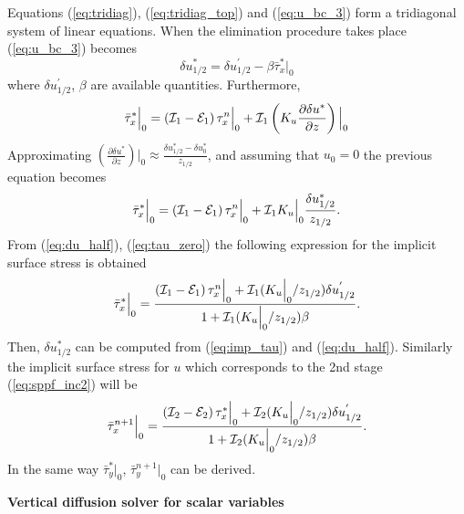 \documentclass{UMDP_article}
\begin{document}
Equations (\ref{eq:tridiag}), (\ref{eq:tridiag_top}) and
(\ref{eq:u_bc_3}) form a tridiagonal system of linear equations.  When
the elimination procedure takes place (\ref{eq:u_bc_3}) becomes
\begin{equation}
  \delta u_{1/2}^{*}=\delta u_{1/2}^{'}-\beta\bar{\tau}_{x}^{*}\Big|_{0}\label{eq:du_half}
\end{equation}
where $\delta u_{1/2}^{'}$, $\beta$ are available
quantities. Furthermore,
\begin{equation*}
  \bar{\tau}_{x}^{*}\Big|_{0}=\left({\cal I}_{1}-{\cal E}_{1}\right)\tau_{x}^{n}\Big|_{0}+{\cal I}_{1}\left(K_{u}\frac{\partial\delta u^{*}}{\partial z}\right)\Big|_{0}
\end{equation*}
Approximating $\left(\frac{\partial\delta u^{*}}{\partial
    z}\right)\Big|_{0}\approx\frac{\delta u_{1/2}^{*}-\delta
  u_{0}^{*}}{z_{1/2}}$, and assuming that $u_{0}=0$ the previous
equation becomes
\begin{equation}
  \bar{\tau}_{x}^{*}\Big|_{0}=\left({\cal I}_{1}-{\cal E}_{1}\right)\tau_{x}^{n}\Big|_{0}+{\cal I}_{1}K_{u}\Big|_{0}\frac{\delta u_{1/2}^{*}}{z_{1/2}}.\label{eq:tau_zero}
\end{equation}
From (\ref{eq:du_half}), (\ref{eq:tau_zero}) the following expression
for the implicit surface stress is obtained
\begin{equation}
  \bar{\tau}_{x}^{*}\Big|_{0}=\frac{\left({\cal I}_{1}-{\cal E}_{1}\right)\tau_{x}^{n}\Big|_{0}+{\cal I}_{1}(K_{u}\Big|_{0}/z_{1/2})\delta
    u_{1/2}^{'}}{1+{\cal I}_{1}(K_{u}\Big|_{0}/z_{1/2})\beta}.\label{eq:imp_tau}
\end{equation}
Then, $\delta u_{1/2}^{*}$ can be computed from (\ref{eq:imp_tau}) and
(\ref{eq:du_half}). Similarly the implicit surface stress for $u$
which corresponds to the 2nd stage (\ref{eq:sppf_inc2}) will be
\begin{equation}
  \bar{\tau}_{x}^{n+1}\Big|_{0}=\frac{\left({\cal I}_{2}-{\cal E}_{2}\right)\tau_{x}^{*}\Big|_{0}+{\cal I}_{2}(K_{u}\Big|_{0}/z_{1/2})\delta
    u_{1/2}^{'}}{1+{\cal I}_{2}(K_{u}\Big|_{0}/z_{1/2})\beta}.\label{eq:imp_tau2}
\end{equation}
In the same way $\bar{\tau}_{y}^{*}\Big|_{0}$,
$\bar{\tau}_{y}^{n+1}\Big|_{0}$ can be derived.

\noindent
{\bf Vertical diffusion solver for scalar variables}
\end{document}
